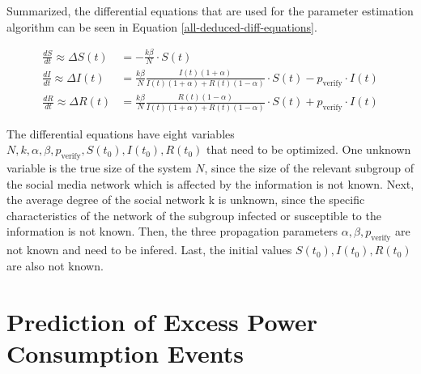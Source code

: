 Summarized, the differential equations that are used for the parameter estimation 
algorithm can be seen in Equation \ref{all-deduced-diff-equations}.

\begin{subequations}
    \begin{align}
        \frac{dS}{dt} \approx \Delta S(t) &= -\frac{k\beta}{N} \cdot S(t) \\
        \frac{dI}{dt} \approx \Delta I(t) &=  \frac{k\beta}{N} \frac{I(t)(1+\alpha)}{I(t)(1+\alpha)+R(t)(1-\alpha)}
        \cdot S(t) - p_{{\mathrm{verify}}}\cdot I(t) \\
        \frac{dR}{dt} \approx \Delta R(t) &= \frac{k\beta}{N} \frac{R(t)(1-\alpha)}{I(t)(1+\alpha)+R(t)(1-\alpha)} 
        \cdot S(t) + p_{{\mathrm{verify}}}\cdot I(t)
\end{align}
\label{all-deduced-diff-equations}
\end{subequations}


The differential equations have eight variables 
$N, k, \alpha, \beta, p_{{\mathrm{verify}}}, S(t_0), I(t_0), R(t_0)$
that need to be optimized. One unknown variable is
the true size of the system $N$, since the size of the relevant
subgroup of the social media network which is affected by the information is 
not known.
Next, the average degree of the social network k is unknown,
since the specific characteristics of the network of the
subgroup infected or susceptible to the information is not known.
Then, the three propagation parameters $\alpha, \beta, p_{{\mathrm{verify}}}$ 
are not known and need to be infered. 
Last, the initial values $S(t_0), I(t_0), R(t_0)$ are also not known.

\section{Prediction of Excess Power Consumption Events}

